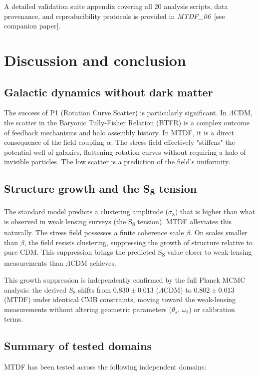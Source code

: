 \documentclass[11pt,a4paper]{article}
\begin{document}
A detailed validation suite appendix covering all 20 analysis scripts, data provenance, and reproducibility protocols is provided in \textit{MTDF\_\allowbreak{}06}~[see companion paper].

\section{Discussion and conclusion}
\label{sec:sec13}

\subsection{Galactic dynamics without dark matter}
The success of P1 (Rotation Curve Scatter) is particularly significant. In $\Lambda$CDM, the scatter in the Baryonic Tully-Fisher Relation (BTFR) is a complex outcome of feedback mechanisms and halo assembly history. In MTDF, it is a direct consequence of the field coupling $\alpha$. The stress field effectively "stiffens" the potential well of galaxies, flattening rotation curves without requiring a halo of invisible particles. The low scatter is a prediction of the field's uniformity.

\subsection{Structure growth and the S\textsubscript{8} tension}
The standard model predicts a clustering amplitude ($\sigma_8$) that is higher than what is observed in weak lensing surveys (the S\textsubscript{8} tension). MTDF alleviates this naturally. The stress field possesses a finite coherence scale $\beta$. On scales smaller than $\beta$, the field resists clustering, suppressing the growth of structure relative to pure CDM. This suppression brings the predicted S\textsubscript{8} value closer to weak-lensing measurements than $\Lambda$CDM achieves.

This growth suppression is independently confirmed by the full Planck MCMC analysis: the derived $S_8$ shifts from $0.830 \pm 0.013$ ($\Lambda$CDM) to $0.802 \pm 0.013$ (MTDF) under identical CMB constraints, moving toward the weak-lensing measurements without altering geometric parameters ($\theta_s$, $\omega_b$) or calibration terms.

\subsection{Summary of tested domains}
MTDF has been tested across the following independent domains:
\end{document}
